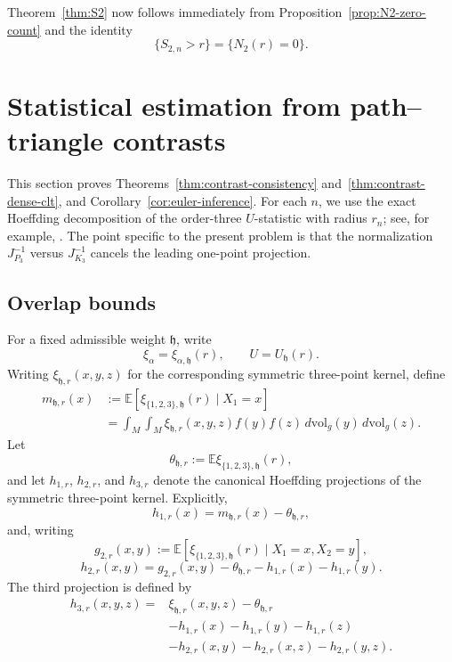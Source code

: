 \documentclass[11pt]{article}
\theoremstyle{remark}
\newcommand{\E}{\mathbb E}
\numberwithin{equation}{section}
\begin{document}
Theorem~\ref{thm:S2} now follows immediately from
Proposition~\ref{prop:N2-zero-count} and the identity
\[
\{S_{2,n}>r\}=\{N_2(r)=0\}.
\]



\section{Statistical estimation from path--triangle contrasts}
\label{sec:statistical-inference}

This section proves Theorems~\ref{thm:contrast-consistency}
and~\ref{thm:contrast-dense-clt}, and
Corollary~\ref{cor:euler-inference}.  For each $n$, we use the exact Hoeffding decomposition of the order-three
$U$-statistic with radius $r_n$; see, for example,
\cite[Chapter~5]{Serfling1980}.  The point specific to the present problem is
that the normalization $J_{P_3}^{-1}$ versus $J_{K_3}^{-1}$ cancels the
leading one-point projection.

\subsection{Overlap bounds}

For a fixed admissible weight $\mathfrak h$, write
\[
\xi_\alpha=\xi_{\alpha,\mathfrak h}(r),
\qquad
U=U_{\mathfrak h}(r).
\]
Writing $\xi_{\mathfrak h,r}(x,y,z)$ for the corresponding symmetric
three-point kernel, define
\[
\begin{aligned}
m_{\mathfrak h,r}(x)
&:=\E\!\left[
\xi_{\{1,2,3\},\mathfrak h}(r)\mid X_1=x
\right] \\
&=
\int_M\int_M
\xi_{\mathfrak h,r}(x,y,z)
f(y)f(z)\,
d\mathrm{vol}_g(y)\,d\mathrm{vol}_g(z).
\end{aligned}
\]
Let
\[
\theta_{\mathfrak h,r}
:=
\E\xi_{\{1,2,3\},\mathfrak h}(r),
\]
and let $h_{1,r}$, $h_{2,r}$, and $h_{3,r}$ denote the canonical
Hoeffding projections of the symmetric three-point kernel.  Explicitly,
\[
h_{1,r}(x)
=
m_{\mathfrak h,r}(x)-\theta_{\mathfrak h,r},
\]
and, writing
\[
g_{2,r}(x,y)
:=
\E[\xi_{\{1,2,3\},\mathfrak h}(r)
\mid X_1=x,X_2=y],
\]
\[
h_{2,r}(x,y)
=
g_{2,r}(x,y)
-\theta_{\mathfrak h,r}
-h_{1,r}(x)-h_{1,r}(y).
\]
The third projection is defined by
\[
\begin{aligned}
h_{3,r}(x,y,z)
={}&
\xi_{\mathfrak h,r}(x,y,z)-\theta_{\mathfrak h,r}\\
&-h_{1,r}(x)-h_{1,r}(y)-h_{1,r}(z)\\
&-h_{2,r}(x,y)-h_{2,r}(x,z)-h_{2,r}(y,z).
\end{aligned}
\]
\end{document}
